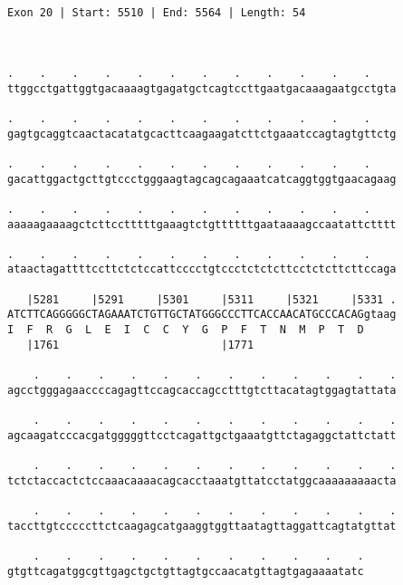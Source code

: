 \documentclass{article}
\begin{document}
\begin{Verbatim}
                        
 
Exon 20 | Start: 5510 | End: 5564 | Length: 54



.    .    .    .    .    .    .    .    .    .    .    .    
ttggcctgattggtgacaaaagtgagatgctcagtccttgaatgacaaagaatgcctgta
                                                            
.    .    .    .    .    .    .    .    .    .    .    .    
gagtgcaggtcaactacatatgcacttcaagaagatcttctgaaatccagtagtgttctg
                                                            
.    .    .    .    .    .    .    .    .    .    .    .    
gacattggactgcttgtccctgggaagtagcagcagaaatcatcaggtggtgaacagaag
                                                            
.    .    .    .    .    .    .    .    .    .    .    .    
aaaaagaaaagctcttcctttttgaaagtctgttttttgaataaaagccaatattctttt
                                                            
.    .    .    .    .    .    .    .    .    .    .    .    
ataactagattttccttctctccattcccctgtccctctctcttcctctcttcttccaga
                                                            
   |5281     |5291     |5301     |5311     |5321     |5331 .
ATCTTCAGGGGGCTAGAAATCTGTTGCTATGGGCCCTTCACCAACATGCCCACAGgtaag
I  F  R  G  L  E  I  C  C  Y  G  P  F  T  N  M  P  T  D     
   |1761                         |1771                      
  
    .    .    .    .    .    .    .    .    .    .    .    .
agcctgggagaaccccagagttccagcaccagcctttgtcttacatagtggagtattata
                                                            
    .    .    .    .    .    .    .    .    .    .    .    .
agcaagatcccacgatgggggttcctcagattgctgaaatgttctagaggctattctatt
                                                            
    .    .    .    .    .    .    .    .    .    .    .    .
tctctaccactctccaaacaaaacagcacctaaatgttatcctatggcaaaaaaaaacta
                                                            
    .    .    .    .    .    .    .    .    .    .    .    .
taccttgtcccccttctcaagagcatgaaggtggttaatagttaggattcagtatgttat
                                                            
    .    .    .    .    .    .    .    .    .    .    .
gtgttcagatggcgttgagctgctgttagtgccaacatgttagtgagaaaatatc
                                                       

\end{Verbatim}
\end{document}
